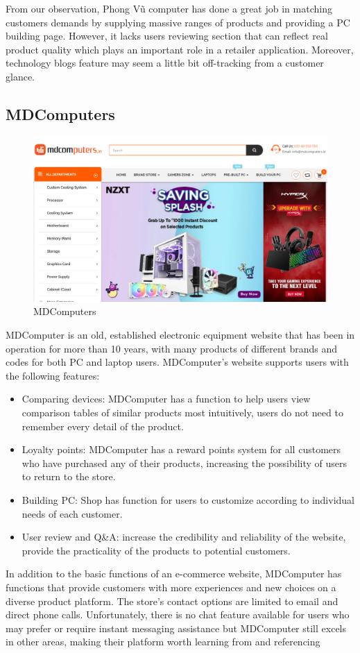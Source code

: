 \noindent From our observation, Phong Vũ computer has done a great job in matching customers demands by supplying massive ranges of products and providing a PC building page. However, it lacks users reviewing section that can reflect real product quality which plays an important role in a retailer application. Moreover, technology blogs feature may seem a little bit off-tracking from a customer glance.

\subsection{MDComputers}

\begin{figure}[H]
    \centering
    \includegraphics[width=1\linewidth]{image/related-works/mdcomputer.PNG}
    \caption{MDComputers}
    \label{fig:mdcomputer}
\end{figure}

\noindent MDComputer is an old, established electronic equipment website that has been in operation for more than 10 years, with many products of different brands and codes for both PC and laptop users. MDComputer's website supports users with the following features:
\begin{itemize}
    \item Comparing devices: MDComputer has a function to help users view comparison tables of similar products most intuitively, users do not need to remember every detail of the product.
    \item Loyalty points: MDComputer has a reward points system for all customers who have purchased any of their products, increasing the possibility of users to return to the store.
    \item Building PC: Shop has function for users to customize according to individual needs of each customer.
    \item User review and Q\&A: increase the credibility and reliability of the website, provide the practicality of the products to potential customers.
\end{itemize}
In addition to the basic functions of an e-commerce website, MDComputer has functions that provide customers with more experiences and new choices on a diverse product platform. The store's contact options are limited to email and direct phone calls. Unfortunately, there is no chat feature available for users who may prefer or require instant messaging assistance but MDComputer still excels in other areas, making their platform worth learning from and referencing
